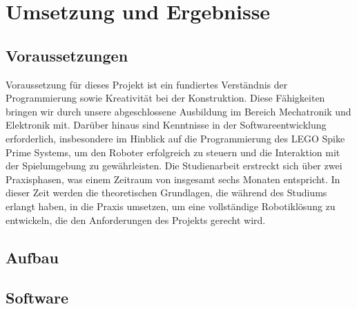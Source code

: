 \chapter{Umsetzung und Ergebnisse}
\label{cha:umsetzung}

%
%

\section{Voraussetzungen}
Voraussetzung für dieses Projekt ist ein fundiertes Verständnis der Programmierung sowie Kreativität bei der Konstruktion. Diese Fähigkeiten bringen wir durch unsere abgeschlossene Ausbildung im Bereich Mechatronik und Elektronik mit. Darüber hinaus sind Kenntnisse in der Softwareentwicklung erforderlich, insbesondere im Hinblick auf die Programmierung des LEGO Spike Prime Systems, um den Roboter erfolgreich zu steuern und die Interaktion mit der Spielumgebung zu gewährleisten.
Die Studienarbeit erstreckt sich über zwei Praxisphasen, was einem Zeitraum von insgesamt sechs Monaten entspricht. In dieser Zeit werden die theoretischen Grundlagen, die während des Studiums erlangt haben, in die Praxis umsetzen, um eine vollständige Robotiklösung zu entwickeln, die den Anforderungen des Projekts gerecht wird.

\section{Aufbau}
\section{Software}

